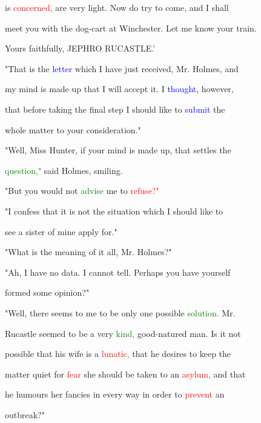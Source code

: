  is \textcolor{red}{concerned,} are very light. Now do try to come, and I shall

 meet you with the dog-cart at Winchester. Let me know your train.

 Yours faithfully, JEPHRO RUCASTLE.'



 "That is the \textcolor{blue}{letter} which I have just received, Mr. Holmes, and

 my mind is made up that I will accept it. I \textcolor{blue}{thought,} however,

 that before taking the final step I should like to \textcolor{blue}{submit} the

 whole matter to your consideration."



 "Well, Miss \textcolor{BurntOrange}{Hunter,} if your mind is made up, that settles the

 \textcolor{green}{question,"} said Holmes, \textcolor{BurntOrange}{smiling.}



 "But you would not \textcolor{green}{advise} me to \textcolor{red}{refuse?"}



 "I \textcolor{BurntOrange}{confess} that it is not the situation which I should like to

 see a sister of mine apply for."



 "What is the meaning of it all, Mr. Holmes?"



 "Ah, I have no data. I cannot tell. Perhaps you have yourself

 formed some opinion?"



 "Well, there seems to me to be only one possible \textcolor{green}{solution.} Mr.

 Rucastle seemed to be a very \textcolor{green}{kind,} good-natured man. Is it not

 possible that his wife is a \textcolor{red}{lunatic,} that he desires to keep the

 matter \textcolor{BurntOrange}{quiet} for \textcolor{red}{fear} she should be taken to an \textcolor{red}{asylum,} and that

 he humours her \textcolor{BurntOrange}{fancies} in every way in order to \textcolor{red}{prevent} an

 outbreak?"



